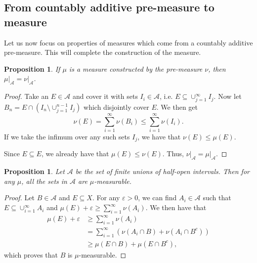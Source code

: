 \documentclass{article}
\newtheorem{proposition}[theorem]{Proposition}
\theoremstyle{definition}
\begin{document}
\subsection{From countably additive pre-measure to measure}

Let us now focus on properties of measures
which come from a countably additive pre-measure.
This will complete the construction of the measure.

\begin{proposition}
    If \( \mu \) is a measure constructed by the pre-measure \(\nu\), then
    \( \mu \big\vert_{\mathcal{A}} = \nu \big\vert_{\mathcal{A}} \).
\end{proposition}
\begin{proof}
    Take an \( E \in \mathcal{A} \) and cover it with sets \( I_{i} \in
    \mathcal{A} \), i.e. \( E \subseteq \cup_{j =
    1}^{\infty}
    I_{j}\). Now let \( B_{n} = E \cap (I_{n} \setminus \cup_{j = 1}^{n - 1}
    I_{j}) \) which disjointly cover \(E\). We then get
    \begin{displaymath}
        \nu(E) = \sum_{i = 1}^{\infty} \nu(B_{i}) \leq \sum_{i = 1}^{\infty}
        \nu(I_{i}).
    \end{displaymath}
    If we take the infimum over any such sets \( I_{j} \), we have that \(
    \nu(E) \leq \mu(E) \).

    Since \( E \subseteq E \), we already have that \( \mu(E) \leq
    \nu(E) \). Thus, \( \nu \big\vert_{\mathcal{A}} = \mu
    \big\vert_{\mathcal{A}} \).
\end{proof}

\begin{proposition}
    Let \( \mathcal{A} \) be the set of finite unions of half-open
    intervals. Then for any \(\mu\), all the sets in \( \mathcal{A} \) are
    \(\mu\)-measurable.
\end{proposition}
\begin{proof}
    Let \( B \in \mathcal{A} \) and \( E \subseteq X \). For any \(
    \varepsilon > 0 \), we can find \( A_{i} \in \mathcal{A} \) such that \(
    E \subseteq \cup_{i = 1}^{\infty} A_{i} \) and \( \mu(E) + \varepsilon
    \geq \sum_{i = 1}^{\infty} \nu(A_{i}) \). We then have that
    \begin{align*}
        \mu(E) + \varepsilon
        &\geq \sum_{i = 1}^{\infty} \nu(A_{i})\\
        &= \sum_{i = 1}^{\infty} \left( \nu(A_{i} \cap B) + \nu(A_{i}
        \cap B^c) \right)\\
        &\geq \mu(E \cap B) + \mu(E \cap B^c),
    \end{align*}
    which proves that \( B \) is \(\mu\)-measurable.
\end{proof}
\end{document}
